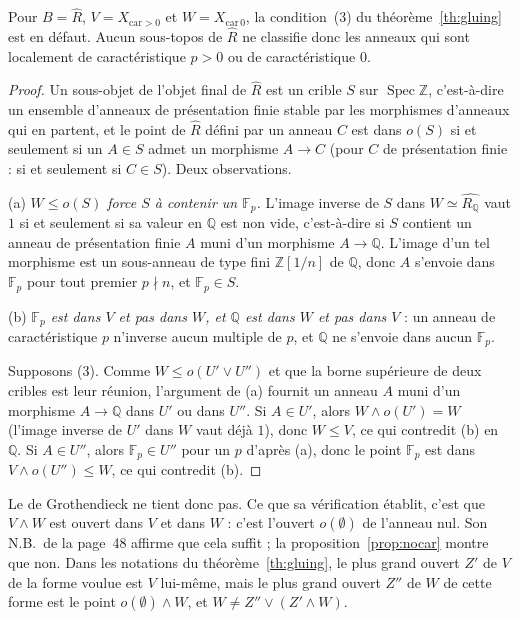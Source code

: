 \begin{proposition}\label{prop:nocar}
Pour $B = \widehat R$, $V = X_{\mathrm{car}>0}$ et $W = X_{\mathrm{car}\,0}$, la condition~(3) du théorème~\ref{th:gluing} est en défaut. Aucun sous-topos de $\widehat R$ ne classifie donc les anneaux qui sont localement de caractéristique $p>0$ ou de caractéristique $0$.
\end{proposition}

\begin{proof}
Un sous-objet de l'objet final de $\widehat R$ est un crible $S$ sur $\operatorname{Spec}\mathbb Z$, c'est-à-dire un ensemble d'anneaux de présentation finie stable par les morphismes d'anneaux qui en partent, et le point de $\widehat R$ défini par un anneau $C$ est dans $o(S)$ si et seulement si un $A\in S$ admet un morphisme $A\to C$ (pour $C$ de présentation finie : si et seulement si $C\in S$). Deux observations.

(a) \emph{$W\le o(S)$ force $S$ à contenir un $\mathbb F_p$.} L'image inverse de $S$ dans $W\simeq\widehat{R_{\mathbb Q}}$ vaut $1$ si et seulement si sa valeur en $\mathbb Q$ est non vide, c'est-à-dire si $S$ contient un anneau de présentation finie $A$ muni d'un morphisme $A\to\mathbb Q$. L'image d'un tel morphisme est un sous-anneau de type fini $\mathbb Z[1/n]$ de $\mathbb Q$, donc $A$ s'envoie dans $\mathbb F_p$ pour tout premier $p\nmid n$, et $\mathbb F_p\in S$.

(b) \emph{$\mathbb F_p$ est dans $V$ et pas dans $W$, et $\mathbb Q$ est dans $W$ et pas dans $V$} : un anneau de caractéristique $p$ n'inverse aucun multiple de $p$, et $\mathbb Q$ ne s'envoie dans aucun $\mathbb F_p$.

Supposons (3). Comme $W\le o(U'\vee U'')$ et que la borne supérieure de deux cribles est leur réunion, l'argument de (a) fournit un anneau $A$ muni d'un morphisme $A\to\mathbb Q$ dans $U'$ ou dans $U''$. Si $A\in U'$, alors $W\wedge o(U') = W$ (l'image inverse de $U'$ dans $W$ vaut déjà $1$), donc $W\le V$, ce qui contredit (b) en $\mathbb Q$. Si $A\in U''$, alors $\mathbb F_p\in U''$ pour un $p$ d'après (a), donc le point $\mathbb F_p$ est dans $V\wedge o(U'')\le W$, ce qui contredit (b).
\end{proof}

Le  de Grothendieck ne tient donc pas. Ce que sa vérification établit, c'est que $V\wedge W$ est ouvert dans $V$ et dans $W$ : c'est l'ouvert $o(\emptyset)$ de l'anneau nul. Son N.B.\ de la page~48 affirme que cela suffit ; la proposition~\ref{prop:nocar} montre que non. Dans les notations du théorème~\ref{th:gluing}, le plus grand ouvert $Z'$ de $V$ de la forme voulue est $V$ lui-même, mais le plus grand ouvert $Z''$ de $W$ de cette forme est le point $o(\emptyset)\wedge W$, et $W\ne Z''\vee(Z'\wedge W)$.

